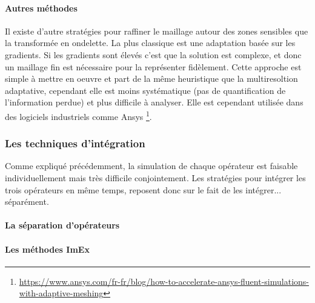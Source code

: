         \paragraph{Autres méthodes}
        Il existe d'autre stratégies pour raffiner le maillage autour des zones sensibles que la transformée en ondelette. 
        La plus classique est une adaptation basée sur les gradients. Si les gradients sont élevés c'est que la solution est complexe,
        et donc un maillage fin est nécessaire pour la représenter fidèlement. Cette approche est simple à mettre en oeuvre et part de la même heuristique 
        que la multiresoltion adaptative, cependant elle est moins systématique (pas de quantification de l'information perdue) et plus difficile à analyser. 
        Elle est cependant utilisée dans des logiciels industriels comme Ansys 
        \footnote{\href{https://www.ansys.com/fr-fr/blog/how-to-accelerate-ansys-fluent-simulations-with-adaptive-meshing}{https://www.ansys.com/fr-fr/blog/how-to-accelerate-ansys-fluent-simulations-with-adaptive-meshing}}.

    \subsubsection{Les techniques d'intégration}
        Comme expliqué précédemment, la simulation de chaque opérateur est faisable individuellement mais très difficile conjointement. 
        Les stratégies pour intégrer les trois opérateurs en même temps, reposent donc sur le fait de les intégrer... séparément.
        \paragraph{La séparation d'opérateurs}
        \paragraph{Les méthodes ImEx}
        